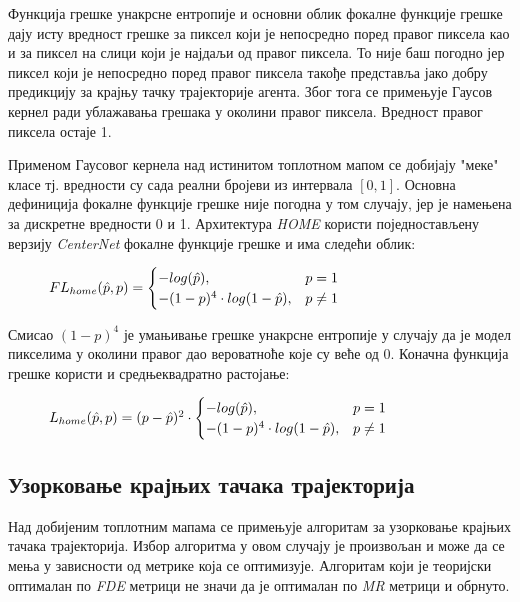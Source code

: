 \documentclass[11pt,oneside]{memoir}
\begin{document}
Функција грешке унакрсне ентропије и основни облик фокалне функције грешке дају исту вредност грешке за пиксел који је непосредно поред правог пиксела као и за
пиксел на слици који је најдаљи од правог пиксела. То није баш погодно јер пиксел који је непосредно поред правог пиксела такође 
представља јако добру предикцију за крајњу тачку трајекторије агента. 
Због тога се примењује Гаусов кернел ради ублажавања грешака у околини правог пиксела.
Вредност правог пиксела остаје 1.

Применом Гаусовог кернела над истинитом топлотном мапом се добијају "меке" класе тј. вредности су сада реални бројеви из интервала $[0, 1]$. 
Основна дефиниција фокалне функције грешке није погодна у том случају, јер је намењена за дискретне вредности 0 и 1. Архитектура \textit{HOME} користи
поједностављену верзију \textit{CenterNet} фокалне функције грешке и има следећи облик:

\begin{figure}[H]
  \centering
  $ FL_{home}(\hat{p}, p) =
  \begin{cases}
    \centering
    -log(\hat{p}) , & p = 1 \\
    -(1-p)^{4}\cdot log(1-\hat{p}), & p \neq 1
  \end{cases}
  $
\end{figure}

Смисао $(1-p)^4$ је умањивање грешке унакрсне ентропије у случају да је модел пикселима у околини правог дао вероватноће које су веће од 0.
Коначна функција грешке користи и средњеквадратно растојање:

\begin{figure}[H]
  \centering
  $ L_{home}(\hat{p}, p) = (p - \hat{p})^{2} \cdot
  \begin{cases}
    \centering
    -log(\hat{p}) , & p = 1 \\
    -(1-p)^{4}\cdot log(1-\hat{p}), & p \neq 1
  \end{cases}
  $
\end{figure}

\subsection{Узорковање крајњих тачака трајекторија}

Над добијеним топлотним мапама се примењује алгоритам за узорковање крајњих тачака трајекторија. Избор алгоритма у овом случају
је произвољан и може да се мења у зависности од метрике која се оптимизује. Алгоритам који је теоријски оптималан по \textit{FDE} метрици
не значи да је оптималан по \textit{MR} метрици и обрнуто. 
\end{document}
